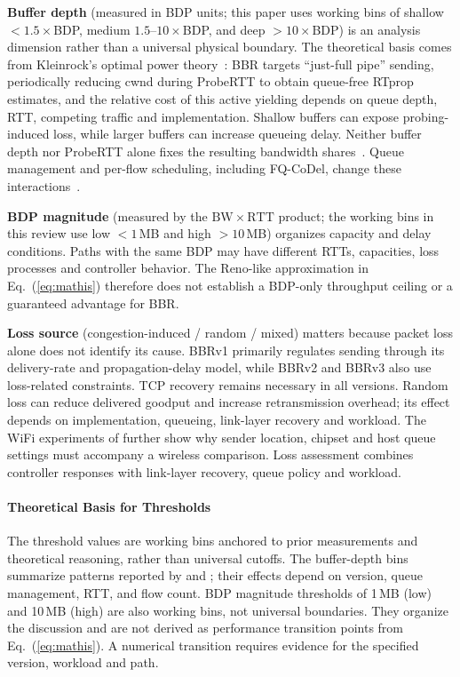\documentclass[a4paper,fleqn]{cas-sc}
\begin{document}
\textbf{Buffer depth} (measured in BDP units; this paper uses working bins of
shallow $<1.5\times$BDP, medium $1.5$--$10\times$BDP, and deep $>10\times$BDP)
is an analysis dimension rather than a universal physical boundary. The theoretical
basis comes from Kleinrock's optimal power theory~\citep{kleinrock1979power}: BBR
targets ``just-full pipe'' sending, periodically reducing cwnd during ProbeRTT to
obtain queue-free RTprop estimates, and the relative cost of this active
yielding depends on queue depth, RTT, competing traffic and implementation.
Shallow buffers can expose probing-induced loss, while larger buffers can
increase queueing delay. Neither buffer depth nor ProbeRTT alone fixes the
resulting bandwidth shares~\citep{appenzeller2004sizing,dhamdhere2006buffer,wischik2005buffers}.
Queue management and per-flow scheduling, including FQ-CoDel,
change these interactions~\citep{hoeiland2018fq}.

\textbf{BDP magnitude} (measured by the $\mathrm{BW}\times\mathrm{RTT}$ product;
the working bins in this review use low $<1$\,MB and high $>10$\,MB) organizes
capacity and delay conditions. Paths with the same BDP may have different
RTTs, capacities, loss processes and controller behavior. The Reno-like
approximation in Eq.~(\ref{eq:mathis}) therefore does not establish a BDP-only
throughput ceiling or a guaranteed advantage for BBR.

\textbf{Loss source} (congestion-induced / random / mixed) matters because
packet loss alone does not identify its cause. BBRv1 primarily regulates
sending through its delivery-rate and propagation-delay model, while
BBRv2 and BBRv3 also use loss-related constraints. TCP recovery remains
necessary in all versions. Random loss can reduce delivered goodput and
increase retransmission overhead; its effect depends on implementation,
queueing, link-layer recovery and workload. The WiFi experiments of
\citet{grazia2020bbrp} further show why sender location, chipset and host
queue settings must accompany a wireless comparison. Loss assessment combines controller responses with link-layer recovery,
queue policy and workload.

\paragraph{Theoretical Basis for Thresholds}
The threshold values are working bins anchored to prior measurements and
theoretical reasoning, rather than universal cutoffs. The buffer-depth bins
summarize patterns reported by \citet{cao2019bbr} and \citet{jaeger2019bbr};
their effects depend on version, queue management, RTT, and flow count. BDP
magnitude thresholds of 1\,MB (low) and 10\,MB (high) are also working bins,
not universal boundaries. They organize the discussion and are not derived
as performance transition points from Eq.~(\ref{eq:mathis}). A numerical
transition requires evidence for the specified version, workload and path.
\end{document}
